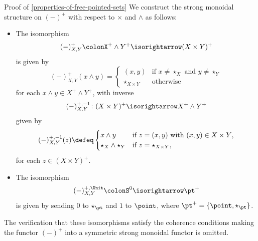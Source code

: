 \begin{Proof}{Proof of \cref{properties-of-free-pointed-sets}}
    We construct the strong monoidal structure on $(-)^{+}$ with respect to $\times$ and $\wedge$ as follows:
    \begin{itemize}
        \item{}The isomorphism
            \[
                (-)^{+}_{X,Y}%
                \colon%
                X^{+}\wedge Y^{+}%
                \isorightarrow
                (X\times Y)^{+}
            \]%
            is given by
            \[
                (-)^{+}_{X,Y}(x\wedge y)%
                =%
                \begin{cases}%
                    (x,y)             &\text{if $x\neq\star_{X}$ and $y\neq\star_{Y}$}\\%
                    \star_{X\times Y} &\text{otherwise}%
                \end{cases}%
            \]%
            for each $x\wedge y\in X^{+}\wedge Y^{+}$, with inverse
            \[
                (-)^{+,-1}_{X,Y}
                \colon%
                (X\times Y)^{+}
                \isorightarrow
                X^{+}\wedge Y^{+}%
            \]%
            given by
            \[
                (-)^{+,-1}_{X,Y}(z)%
                \defeq%
                \begin{cases}
                    x\wedge y                &\text{if $z=(x,y)$ with $(x,y)\in X\times Y$,}\\
                    \star_{X}\wedge\star_{Y} &\text{if $z=\star_{X\times Y}$,}
                \end{cases}
            \]%
            for each $z\in(X\times Y)^{+}$.
        \item{}The isomorphism
            \[
                (-)^{+,\Unit}_{X,Y}%
                \colon%
                S^{0}%
                \isorightarrow
                \pt^{+}%
            \]%
            is given by sending $0$ to $\star_{\pt}$ and $1$ to $\point$, where $\pt^{+}=\{\point,\star_{\pt}\}$.
    \end{itemize}
    The verification that these isomorphisms satisfy the coherence conditions making the functor $(-)^{+}$ into a symmetric strong monoidal functor is omitted.
\end{Proof}
